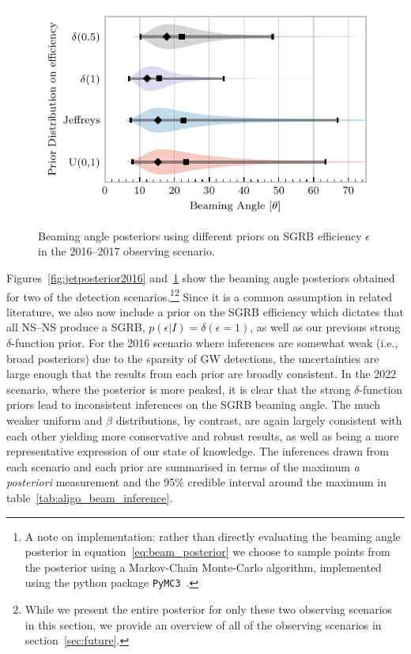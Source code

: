 \documentclass[twocolumn,nofootinbib]{revtex4-1}
\newcommand{\BNS}{\ac{NS}--\ac{NS}\xspace}
\newcommand{\dwnote}[1]{{\color{dwnote}{[\textbf{DW}: #1]}}}
\renewcommand{\dwnote}{}
\begin{document}
\begin{figure}
\centering
{\includegraphics[width=\linewidth]{O2_beaming_posteriors_violin.pdf}}
\caption{Beaming angle posteriors using different priors on \ac{SGRB} efficiency $\epsilon$ in the 2016--2017 observing scenario.
    \label{fig:jetposterior2022}}
\end{figure}

Figures~\ref{fig:jetposterior2016} and~\ref{fig:jetposterior2022} show
the beaming angle posteriors obtained for two of the detection
scenarios.\footnote{
    A note on implementation: rather than directly evaluating
    the beaming angle posterior in equation~\ref{eq:beam_posterior} we
    choose to sample points from the posterior using a Markov-Chain
    Monte-Carlo algorithm, implemented using the python package
    \texttt{PyMC3}~\cite{salvatier2016probabilistic}.
}\footnote{
    While we present the entire posterior for only these two
    observing scenarios in this section, we provide an overview of all
    of the observing scenarios in section~\ref{sec:future}.}
Since it is a common assumption in related literature, we also now include
a prior on the \ac{SGRB} efficiency which dictates that all \BNS produce a
\ac{SGRB}, $p(\epsilon|I)=\delta(\epsilon=1)$, as well as our previous
strong $\delta$-function prior.  For the 2016 scenario where
inferences are somewhat weak (i.e., broad posteriors) due to the
sparsity of \ac{GW} detections, the uncertainties are large enough
that the results from each prior are broadly consistent.  In the 2022
scenario, where the posterior is more peaked, it is clear that the
strong $\delta$-function priors lead to inconsistent inferences on the
\ac{SGRB} beaming angle.  The much weaker uniform and $\beta$
distributions, by contrast, are again largely consistent with each
other yielding more conservative and robust results, as well as being
a more representative expression of our state of knowledge.  The
inferences drawn from each scenario and each prior are summarised in
terms of the maximum \emph{a posteriori} measurement and the 95\%
credible interval around the maximum in
table~\ref{tab:aligo_beam_inference}.
\end{document}
